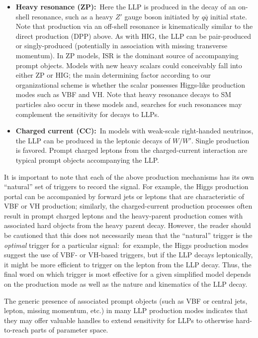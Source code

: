 \begin{itemize}
\item {\bf Heavy resonance (ZP):}~Here the LLP is produced in the decay of an on-shell resonance, such as a heavy $Z'$ gauge boson initiated by $q\bar{q}$ initial state. Note that production via an off-shell resonance is kinematically similar to the direct production (DPP) above.  As with HIG, the LLP can be pair-produced or singly-produced (potentially in association with missing transverse momentum). In ZP models, ISR is the dominant source of accompanying prompt objects. Models with new heavy scalars could conceivably fall into either ZP or HIG; the main determining factor according to our organizational scheme is whether the scalar possesses Higgs-like production modes such as VBF and VH. Note that heavy resonance decays to SM particles also occur in these models and, searches for such resonances \cite{Khachatryan:2016zqb,Sirunyan:2016iap,Aaboud:2017yvp,Sirunyan:2017dnz,Aaboud:2017buh,Aaboud:2018juj,Aaboud:2018zba} may complement the sensitivity for decays to LLPs.

\item {\bf Charged current (CC):}~In models with weak-scale right-handed neutrinos, the LLP can be produced in the leptonic decays of $W/W'$. Single production is favored.  Prompt charged leptons from the charged-current interaction are typical prompt objects accompanying the LLP.
\end{itemize}
%

It is important to note that each of the above production mechanisms has its own ``natural'' set of triggers to record the signal. For example, the Higgs production portal can be accompanied by forward jets or leptons that are characteristic of VBF or VH production; similarly, the charged-current production processes often result in prompt charged leptons and the heavy-parent production comes with associated hard objects from the heavy parent decay. However, the reader should be cautioned that this does not necessarily mean that the ``natural'' trigger is the \emph{optimal} trigger for a particular signal:~for example, the Higgs production modes suggest the use of VBF- or VH-based triggers, but if the LLP decays leptonically, it might be more efficient to trigger on the lepton from the LLP decay. Thus, the final word on which trigger is most effective for a given simplified model depends on the production mode as well as the nature and kinematics of the LLP decay.

The generic presence of associated prompt objects (such as VBF or central jets, lepton, missing momentum, etc.) in many LLP production modes indicates that they may offer valuable handles to extend sensitivity for LLPs to otherwise hard-to-reach parts of parameter space.


